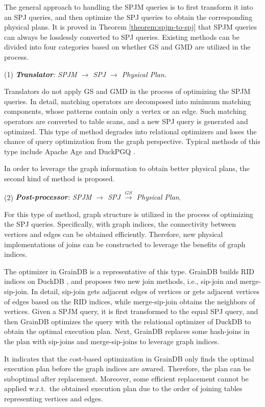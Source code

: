 The general approach to handling the SPJM queries is to first transform it into an SPJ queries, and then optimize the SPJ queries to obtain the corresponding physical plans.
It is proved in Theorem \ref{theorem:spjm-to-spj} that SPJM queries can always be losslessly converted to SPJ queries.
Existing methods can be divided into four categories based on whether GS and GMD are utilized in the process.

(1) \emph{\textbf{Translator}: SPJM $\rightarrow$ SPJ $\rightarrow$ Physical Plan}.

Translators do not apply GS and GMD in the process of optimizing the SPJM queries.
In detail, matching operators are decomposed into minimum matching components, whose patterns contain only a vertex or an edge.
Such matching operators are converted to table scans, and a new SPJ query is generated and optimized.
This type of method degrades into relational optimizers and loses the chance of query optimization from the graph perspective.
Typical methods of this type include Apache Age \cite{apache-age} and DuckPGQ \cite{DuckPGQ,DuckPGQ-VLDB}.


In order to leverage the graph information to obtain better physical plans, the second kind of method is proposed.

(2) \emph{\textbf{Post-processor}: SPJM $\rightarrow$ SPJ $\xrightarrow{GS}$ Physical Plan}.

For this type of method, graph structure is utilized in the process of optimizing the SPJ queries.
Specifically, with graph indices, the connectivity between vertices and edges can be obtained efficiently.
Therefore, new physical implementations of joins can be constructed to leverage the benefits of graph indices.

The optimizer in GrainDB is a representative of this type.
GrainDB builds RID indices on DuckDB \cite{duckdb}, and proposes two new join methods, i.e., sip-join and merge-sip-join.
In detail, sip-join gets adjacent edges of vertices or gets adjacent vertices of edges based on the RID indices, while merge-sip-join obtains the neighbors of vertices.
Given a SPJM query, it is first transformed to the equal SPJ query, and then GrainDB optimizes the query with the relational optimizer of DuckDB to obtain the optimal execution plan.
Next, GrainDB replaces some hash-joins in the plan with sip-joins and merge-sip-joins to leverage graph indices.

It indicates that the cost-based optimization in GrainDB only finds the optimal execution plan before the graph indices are awared.
Therefore, the plan can be suboptimal after replacement.
Moreover, some efficient replacement cannot be applied w.r.t.~the obtained execution plan due to the order of joining tables representing vertices and edges.


